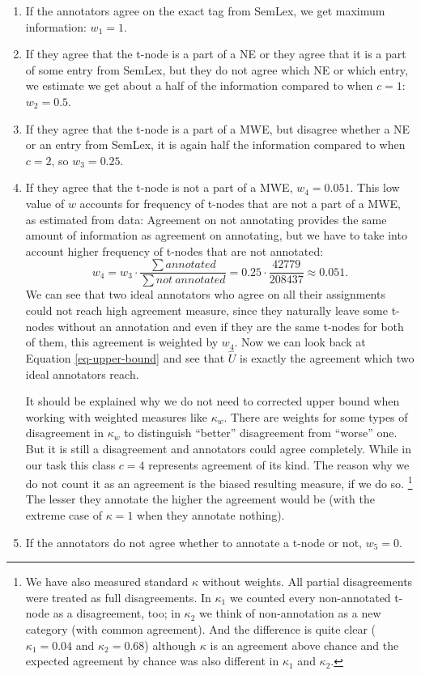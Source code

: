 \begin{enumerate}[$c=1$]
\item
If the annotators agree on the exact tag from SemLex, we get maximum information: $w_1 = 1$.
\item
If they agree that the t-node is a part of a NE or they agree that it is a part of some entry from SemLex, but they do not agree which NE or which entry, we estimate we get about a half of the information compared to when $c=1$: $w_2 = 0.5$.
\item
If they agree that the t-node is a part of a MWE, but disagree whether a NE or an entry from SemLex, it is again half the information compared to when $c=2$, so $w_3 = 0.25$.
\item
If they agree that the t-node is not a part of a MWE, $w_4 = 0.051$. This low value of $w$ accounts for frequency of t-nodes that are not a part of a MWE, as estimated from data: Agreement on not annotating provides the same amount of information as agreement on annotating, but we have to take into account higher frequency of t-nodes that are not annotated: 
  \[  w_4 = w_3 \cdot \frac{\sum annotated}{\sum not\ annotated} = 0.25 \cdot \frac{42779}{208437} \approx 0.051. \]
We can see that two ideal annotators who agree on all their assignments could not reach high agreement measure, since they naturally leave some t-nodes without an annotation and even if they are the same t-nodes for both of them, this agreement is weighted by $w_4$. Now we can look back at Equation \ref{eq-upper-bound} and see that $\widehat{U}$ is exactly the agreement which two ideal annotators reach.

It should be explained why we do not need to corrected upper bound when working with weighted measures like $\kappa_w$.
There are weights for some types of disagreement in $\kappa_w$ to distinguish ``better'' disagreement from ``worse'' one. But it is still a disagreement and annotators could agree completely. While in our task this class $c=4$ represents agreement of its kind. The reason why we do not count it as an agreement is the biased resulting measure, if we do so.%
\footnote{%
We have also measured standard $\kappa$ without weights. All partial disagreements were treated as full disagreements. In $\kappa_1$ we counted every non-annotated t-node as a disagreement, too; in $\kappa_2$ we think of non-annotation as a new category (with common agreement). And the difference is quite clear ($\kappa_1 = 0.04$ and $\kappa_2 = 0.68$) although $\kappa$ is an agreement above chance and the expected agreement by chance was also different in $\kappa_1$ and $\kappa_2$.}
The lesser they annotate the higher the agreement would be (with the extreme case of $\kappa = 1$ when they annotate nothing).
 
\item
If the annotators do not agree whether to annotate a t-node or not, $w_5 = 0$. 
\end{enumerate}

